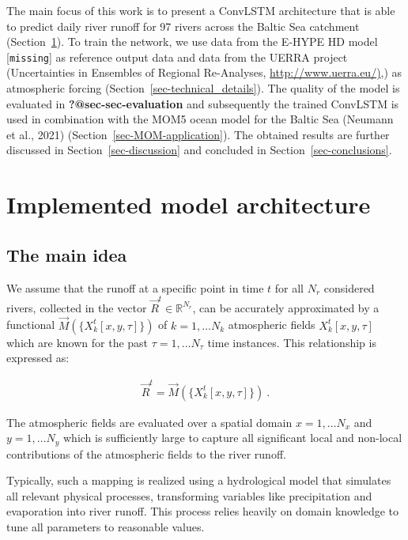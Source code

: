\documentclass[
]{agujournal2019}
\begin{document}
The main focus of this work is to present a ConvLSTM architecture that
is able to predict daily river runoff for 97 rivers across the Baltic
Sea catchment (Section~\ref{sec-methodology}). To train the network, we
use data from the E-HYPE HD model {[}\texttt{missing}{]} as reference
output data and data from the UERRA project (Uncertainties in Ensembles
of Regional Re-Analyses,
\href{http://www.uerra.eu/}{http://www.uerra.eu/)},) as atmospheric
forcing (Section~\ref{sec-technical_details}). The quality of the model
is evaluated in \textbf{?@sec-sec-evaluation} and subsequently the
trained ConvLSTM is used in combination with the MOM5 ocean model for
the Baltic Sea (Neumann et al., 2021)
(Section~\ref{sec-MOM-application}). The obtained results are further
discussed in Section~\ref{sec-discussion} and concluded in
Section~\ref{sec-conclusions}.

\section{Implemented model architecture}\label{sec-methodology}

\subsection{The main idea}\label{sec-main_idea}

We assume that the runoff at a specific point in time \(t\) for all
\(N_r\) considered rivers, collected in the vector
\(\vec{R}^t \in \mathbb{R}^{N_r}\), can be accurately approximated by a
functional \(\vec{M}(\{X^t_k[x,y,\tau]\})\) of \(k=1,\ldots N_k\)
atmospheric fields \(X^t_k[x,y,\tau]\) which are known for the past
\(\tau=1,\ldots N_\tau\) time instances. This relationship is expressed
as:

\[
\begin{aligned}
\vec{R}^t = \vec{M}(\{X^t_k[x,y,\tau]\}) \ .
\end{aligned}
\]

The atmospheric fields are evaluated over a spatial domain
\(x=1,\ldots N_x\) and \(y=1,\ldots N_y\) which is sufficiently large to
capture all significant local and non-local contributions of the
atmospheric fields to the river runoff.

Typically, such a mapping is realized using a hydrological model that
simulates all relevant physical processes, transforming variables like
precipitation and evaporation into river runoff. This process relies
heavily on domain knowledge to tune all parameters to reasonable values.
\end{document}
